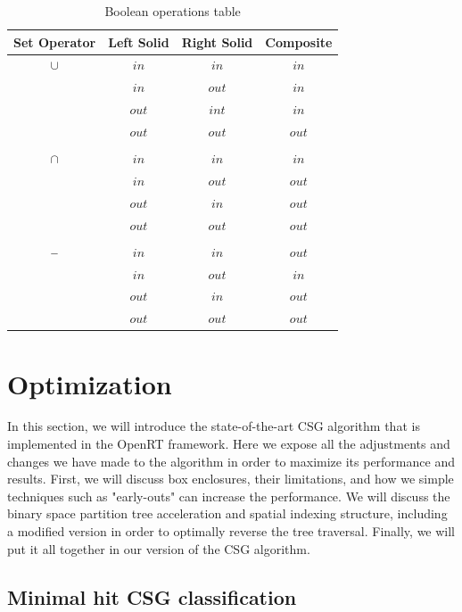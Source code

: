 \documentclass[a4paper,11pt,oneside]{article}
\newcommand{\minus}{\scalebox{0.9}[1.0]{$-$}} %
\begin{document}
\begin{table}[h]
	\centering
	\caption{Boolean operations table}
	\label{section3:boolean_algebra}
	\begin{tabular}{||c c c c||} 
		\hline
		Set Operator & Left Solid & Right Solid  & Composite \\ [0.5ex] 
		\hline\hline
		$\cup$    & $in$ & $in$ & $in$  \\
		    	  & $in$ & $out$ & $in$  \\
		    	  & $out$ & $int$ & $in$  \\
		 	   	  & $out$ & $out$ & $out$  \\
		& & & \\
		$\cap$    & $in$ & $in$ & $in$  \\
		    	  & $in$ & $out$ & $out$  \\
		    	  & $out$ & $in$ & $out$  \\
		 	   	  & $out$ & $out$ & $out$  \\
		& & & \\
		$\minus$ & $in$ & $in$ & $out$  \\
		    	  & $in$ & $out$ & $in$  \\
		    	  & $out$ & $in$ & $out$  \\
		 	   	  & $out$ & $out$ & $out$  \\		 	   	
		\hline
	\end{tabular}
\end{table}

\section{Optimization}

In this section, we will introduce the state-of-the-art CSG algorithm that is implemented in the OpenRT framework. Here we expose all the adjustments and changes we have made to the algorithm in order to maximize its performance and results. First, we will discuss box enclosures, their limitations, and how we simple techniques such as "early-outs" can increase the performance. We will discuss the binary space partition tree acceleration and spatial indexing structure, including a modified version in order to optimally reverse the tree traversal. Finally, we will put it all together in our version of the CSG algorithm.

\subsection{Minimal hit CSG classification}
\end{document}
